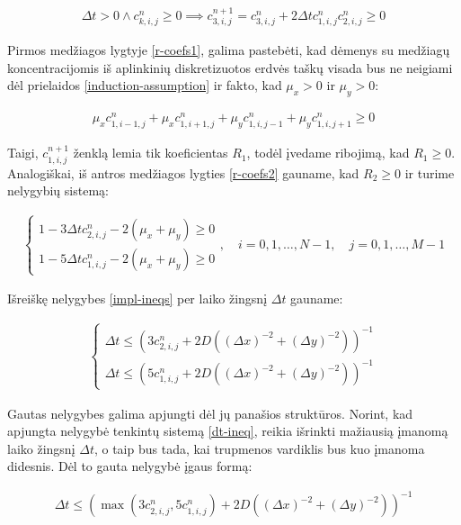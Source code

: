 \begin{align*}
  \Delta t > 0 \land c^n_{k,i,j}\geqslant 0 \implies c^{n+1}_{3,i,j}=c^n_{3,i,j}+2\Delta tc^{n}_{1,i,j}c^{n}_{2,i,j}\geqslant 0 
\end{align*}

Pirmos medžiagos lygtyje \eqref{r-coefs1}, galima pastebėti, kad dėmenys su medžiagų koncentracijomis iš aplinkinių diskretizuotos erdvės taškų visada bus ne neigiami dėl prielaidos \eqref{induction-assumption} ir fakto, kad $\mu_x>0$ ir $\mu_y>0$:

\begin{align*}
    \mu_xc^n_{1,i-1,j}+\mu_xc^n_{1,i+1,j}+\mu_yc^n_{1,i,j-1}+\mu_yc^n_{1,i,j+1}\geqslant 0
\end{align*}

Taigi, $c^{n+1}_{1,i,j}$ ženklą lemia tik koeficientas $R_1$, todėl įvedame ribojimą, kad $R_1\geqslant 0$. Analogiškai, iš antros medžiagos lygties \eqref{r-coefs2} gauname, kad $R_2\geqslant 0$ ir turime nelygybių sistemą:

\begin{align} \label{impl-ineqs}
  \begin{cases}
    1-3\Delta tc^{n}_{2,i,j}-2(\mu_x+\mu_y)\geqslant 0\\
    1-5\Delta tc^{n}_{1,i,j}-2(\mu_x+\mu_y)\geqslant 0
  \end{cases}, \quad i=0,1,\dots,N-1, \quad j=0,1,\dots,M-1
\end{align}

Išreiškę nelygybes \eqref{impl-ineqs} per laiko žingsnį $\Delta t$ gauname:

\begin{align} \label{dt-ineq}
  \begin{cases}
    \Delta t \leqslant (3c^{n}_{2,i,j}+2D((\Delta x)^{-2}+(\Delta y)^{-2}))^{-1}\\
    \Delta t \leqslant (5c^{n}_{1,i,j}+2D((\Delta x)^{-2}+(\Delta y)^{-2}))^{-1}
  \end{cases}
\end{align}

Gautas nelygybes galima apjungti dėl jų panašios struktūros. Norint, kad apjungta nelygybė tenkintų sistemą \eqref{dt-ineq}, reikia išrinkti mažiausią įmanomą laiko žingsnį $\Delta t$, o taip bus tada, kai trupmenos vardiklis bus kuo įmanoma didesnis. Dėl to gauta nelygybė įgaus formą:

\begin{align}
  \Delta t \leqslant \left(\max(3c^{n}_{2,i,j}, 5c^{n}_{1,i,j})+2D\left((\Delta x)^{-2}+(\Delta y)^{-2}\right)\right)^{-1}
\end{align}

